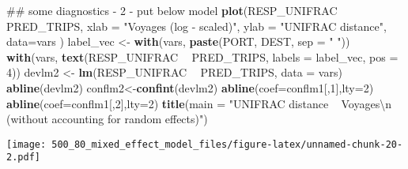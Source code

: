 \documentclass[]{article}
\newenvironment{Shaded}{\begin{snugshade}}{\end{snugshade}}
\newcommand{\KeywordTok}[1]{\textcolor[rgb]{0.13,0.29,0.53}{\textbf{#1}}}
\newcommand{\DataTypeTok}[1]{\textcolor[rgb]{0.13,0.29,0.53}{#1}}
\newcommand{\DecValTok}[1]{\textcolor[rgb]{0.00,0.00,0.81}{#1}}
\newcommand{\CharTok}[1]{\textcolor[rgb]{0.31,0.60,0.02}{#1}}
\newcommand{\StringTok}[1]{\textcolor[rgb]{0.31,0.60,0.02}{#1}}
\newcommand{\OperatorTok}[1]{\textcolor[rgb]{0.81,0.36,0.00}{\textbf{#1}}}
\newcommand{\NormalTok}[1]{#1}
\begin{document}
\begin{Shaded}
\begin{Highlighting}[]
\NormalTok{## some diagnostics - 2 - put below model}
\KeywordTok{plot}\NormalTok{(RESP_UNIFRAC }\OperatorTok{~}\StringTok{ }\NormalTok{PRED_TRIPS, }\DataTypeTok{xlab =} \StringTok{"Voyages (log - scaled)"}\NormalTok{, }\DataTypeTok{ylab =} \StringTok{"UNIFRAC distance"}\NormalTok{, }
     \DataTypeTok{data=}\NormalTok{vars )}
\NormalTok{label_vec <-}\StringTok{ }\KeywordTok{with}\NormalTok{(vars, }\KeywordTok{paste}\NormalTok{(PORT, DEST, }\DataTypeTok{sep =} \StringTok{" "}\NormalTok{))}
\KeywordTok{with}\NormalTok{(vars, }\KeywordTok{text}\NormalTok{(RESP_UNIFRAC }\OperatorTok{~}\StringTok{ }\NormalTok{PRED_TRIPS, }\DataTypeTok{labels =}\NormalTok{ label_vec, }\DataTypeTok{pos =} \DecValTok{4}\NormalTok{))}
\NormalTok{devlm2 <-}\StringTok{ }\KeywordTok{lm}\NormalTok{(RESP_UNIFRAC }\OperatorTok{~}\StringTok{ }\NormalTok{PRED_TRIPS, }\DataTypeTok{data =}\NormalTok{ vars)}
\KeywordTok{abline}\NormalTok{(devlm2)}
\NormalTok{conflm2<-}\KeywordTok{confint}\NormalTok{(devlm2)}
\KeywordTok{abline}\NormalTok{(}\DataTypeTok{coef=}\NormalTok{conflm1[,}\DecValTok{1}\NormalTok{],}\DataTypeTok{lty=}\DecValTok{2}\NormalTok{)}
\KeywordTok{abline}\NormalTok{(}\DataTypeTok{coef=}\NormalTok{conflm1[,}\DecValTok{2}\NormalTok{],}\DataTypeTok{lty=}\DecValTok{2}\NormalTok{)}
\KeywordTok{title}\NormalTok{(}\DataTypeTok{main =} \StringTok{"UNIFRAC distance ~ Voyages}\CharTok{\textbackslash{}n}\StringTok{ (without accounting for random effects)"}\NormalTok{)}
\end{Highlighting}
\end{Shaded}

\texttt{[image: 500\_80\_mixed\_effect\_model\_files/figure-latex/unnamed-chunk-20-2.pdf]}
\end{document}
